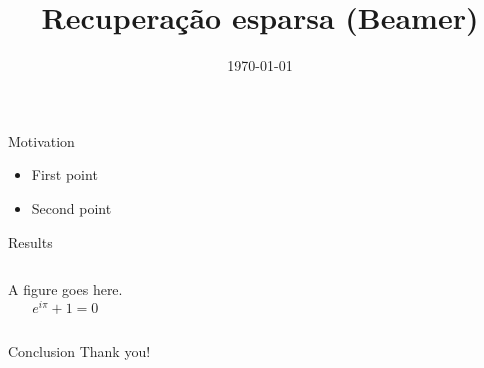 \documentclass[aspectratio=169]{beamer}
\title{Recuperação esparsa (Beamer)}
\author{}
\date{\today}
\begin{document}
\begin{frame}
  \titlepage
\end{frame}

\begin{frame}{Motivation}
  \begin{itemize}
    \item First point
    \item Second point
  \end{itemize}
\end{frame}

\begin{frame}{Results}
  \begin{columns}
      A figure goes here.
      \[ e^{i\pi} + 1 = 0 \]
  \end{columns}
\end{frame}

\begin{frame}{Conclusion}
  Thank you!
\end{frame}
\end{document}
